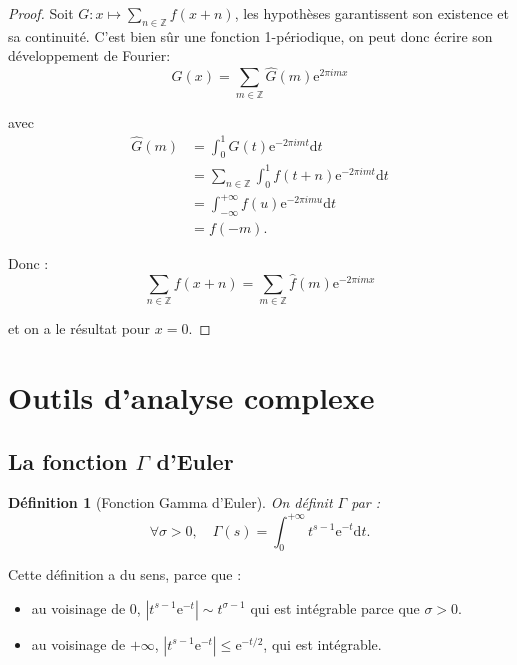 \documentclass[french]{report}
\newtheorem{definition}[theorem]{Définition}
\begin{document}
\begin{proof}
  Soit $G:x\mapsto\sum_{n\in\mathbb{Z}}f(x+n)$, les hypothèses garantissent son existence et sa continuité. C'est bien sûr une fonction 1-périodique, on peut donc écrire son développement de Fourier:
  \[
    G(x)
    =\sum_{m\in\mathbb{Z}}\hat{G}(m)\mathrm{e}^{2\pi imx}
  \]

  avec
  \begin{align*}
    \hat{G}(m)
    &= \int_0^1 G(t)\mathrm{e}^{-2\pi imt}\mathrm{d}t \\
    &= \sum_{n\in\mathbb{Z}}\int_0^1 f(t+n)\mathrm{e}^{-2\pi imt}\mathrm{d}t \\
    &= \int_{-\infty}^{+\infty} f(u)\mathrm{e}^{-2\pi imu}\mathrm{d}t \\
    &= f(-m).
  \end{align*}

  Donc :
  \[
    \sum_{n\in\mathbb{Z}}f(x+n) = \sum_{m\in\mathbb{Z}}\hat{f}(m)\mathrm{e}^{-2\pi imx}
  \]

  et on a le résultat pour $x=0$.
\end{proof}

\section{Outils d'analyse complexe}

\subsection{La fonction $\Gamma$ d'Euler}

\begin{definition}[Fonction Gamma d'Euler]
  On définit $\Gamma$ par :
  \[
    \forall \sigma>0,\quad\Gamma(s)=\int_0^{+\infty}t^{s-1}\mathrm{e}^{-t}\mathrm{d}t.
  \]
\end{definition}

Cette définition a du sens, parce que :
\begin{itemize}
  \item au voisinage de 0, $|t^{s-1}\mathrm{e}^{-t}|\sim t^{\sigma-1}$ qui est intégrable parce que $\sigma>0$.
  \item au voisinage de $+\infty$, $|t^{s-1}\mathrm{e}^{-t}|\leq \mathrm{e}^{-t/2}$, qui est intégrable.
\end{itemize}
\end{document}

